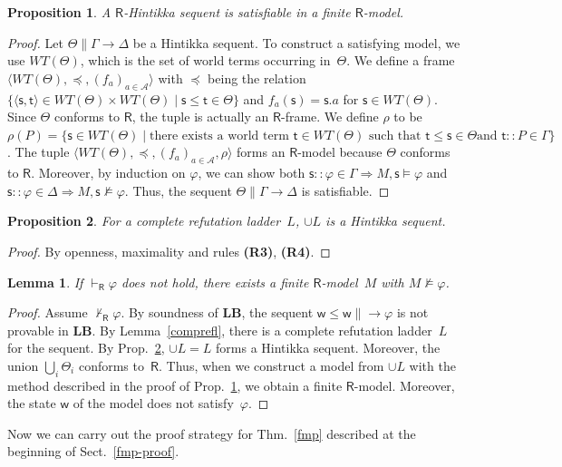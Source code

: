 \documentclass[doctor]{iscs-thesis}
\newcommand{\agents}{\mathcal A}
\newcommand{\tuple}[1]{\langle{#1}\rangle}
\newcommand{\vdashR}{\vdash_{\mathsf R}}
\newtheorem{proposition}{Proposition}
\newtheorem{lemma}{Lemma}
\newcommand{\LB}{\textbf{LB}}
\begin{document}
\begin{proposition}
 \label{Hsat}
 A $\mathsf R$-Hintikka sequent is satisfiable in a finite $\mathsf R$-model.
\end{proposition}
\begin{proof}
 \newcommand{\W}{WT(\Theta)}
 Let $\Theta\parallel \Gamma\longrightarrow\Delta$ be a Hintikka sequent.
 To construct a satisfying model, we use $\W$,
 which is the set of world
 terms occurring in~$\Theta$.
 We define a frame $\tuple{\W, \preceq, (f_a)_{a\in\agents}}$ with
 $\preceq$ being the relation $\{\tuple{\mathsf s,\mathsf t}\in
 \W\times \W\mid
 \mathsf s\le
 \mathsf t\in\Theta\}$ and
 $f_a(\mathsf s) = \mathsf s.a$ for $\mathsf s\in\W$\enspace.
 Since $\Theta$ conforms to $\mathsf R$, 
 the tuple is actually an $\mathsf R$-frame.
 We define $\rho$ to be $\rho(P) = 
 \{\mathsf s\in \W\mid
 \mbox{there exists a world term } \mathsf t \in \W \mbox{ such that }
 \mathsf t\le
 \mathsf s \in \Theta\mbox{
 and }\mathsf t::P\in \Gamma\}$.
 The tuple $\tuple{\W,\preceq,(f_a)_{a\in \agents},\rho}$ forms
 an $\mathsf R$-model because $\Theta$ conforms to $\mathsf R$.
 Moreover, by induction on $\varphi$, we can show both 
 $\mathsf s::\varphi\in\Gamma\Longrightarrow M,\mathsf s\models\varphi$
 and 
 $\mathsf s::\varphi\in\Delta\Longrightarrow M,\mathsf s\not\models\varphi$.
 Thus, the sequent $\Theta\parallel \Gamma\longrightarrow\Delta$ is satisfiable.
\end{proof}

\begin{proposition}
\label{completehintikka}
 For a complete refutation ladder~$L$,
$\cup L$ is a Hintikka sequent.
\end{proposition}
\begin{proof}
 By openness, maximality and rules \textbf{(R3)}, \textbf{(R4)}.
\end{proof}

\begin{lemma}
\label{R-fmp}
 If $\vdashR\varphi$  does not hold, there exists a finite $\mathsf
 R$-model~$M$ with $M\not\models\varphi$.
\end{lemma}
\begin{proof}
 Assume $\not\vdashR\varphi$.
 By soundness of \LB,
 the sequent $\mathsf w\le\mathsf w\parallel \longrightarrow\varphi$ is not
 provable in \LB.
 By Lemma~\ref{comprefl},
 there is a complete refutation ladder~$L$ for the sequent.
 By Prop.~\ref{completehintikka},
 $\cup L = L$  forms a Hintikka
 sequent.
 Moreover, 
 the union $\bigcup_i\Theta_i$ conforms to~$\mathsf
 R$.
 Thus, when we construct a model from $\cup L$ with the method described in
 the proof of Prop.~\ref{Hsat},
 we obtain a finite $\mathsf R$-model.
 Moreover, the state $\mathsf w$ of the model does not satisfy~$\varphi$.
\end{proof}
Now we can carry out the proof strategy for Thm.~\ref{fmp} described
at the beginning of Sect.~\ref{fmp-proof}.
\end{document}
